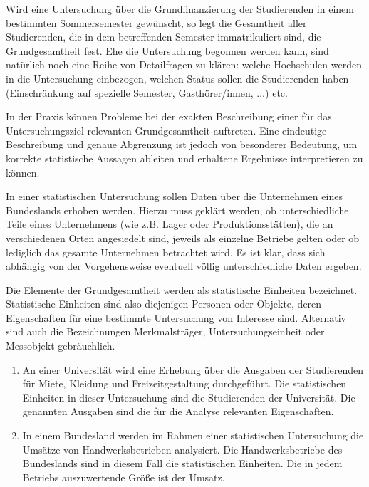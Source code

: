 \documentclass{lecture}
\begin{document}
    \begin{example}
        Wird eine Untersuchung über die Grundfinanzierung der Studierenden in einem bestimmten Sommersemester gewünscht, so legt die Gesamtheit aller Studierenden, die in dem betreffenden Semester immatrikuliert sind, die Grundgesamtheit fest.
        Ehe die Untersuchung begonnen werden kann, sind natürlich noch eine Reihe von Detailfragen zu klären:
        welche Hochschulen werden in die Untersuchung einbezogen, welchen Status sollen die Studierenden haben (Einschränkung auf spezielle Semester, Gasthörer/innen, \(\ldots\)) etc.
    \end{example}

    In der Praxis können Probleme bei der exakten Beschreibung einer für das Untersuchungsziel relevanten Grundgesamtheit auftreten.
    Eine eindeutige Beschreibung und genaue Abgrenzung ist jedoch von besonderer Bedeutung, um korrekte statistische Aussagen ableiten und erhaltene Ergebnisse interpretieren zu können.

    \begin{example}
        In einer statistischen Untersuchung sollen Daten über die Unternehmen eines Bundeslands erhoben werden.
        Hierzu muss geklärt werden, ob unterschiedliche Teile eines Unternehmens (wie z.B. Lager oder Produktionsstätten), die an verschiedenen Orten angesiedelt sind, jeweils als einzelne Betriebe gelten oder ob lediglich das gesamte Unternehmen betrachtet wird.
        Es ist klar, dass sich abhängig von der Vorgehensweise eventuell völlig unterschiedliche Daten ergeben.
    \end{example}

    Die Elemente der Grundgesamtheit werden als statistische Einheiten bezeichnet.
    Statistische Einheiten sind also diejenigen Personen oder Objekte, deren Eigenschaften für eine bestimmte Untersuchung von Interesse sind.
    Alternativ sind auch die Bezeichnungen Merkmalsträger, Untersuchungseinheit oder Messobjekt gebräuchlich.

    \begin{example}
        \begin{enumerate}
            \item An einer Universität wird eine Erhebung über die Ausgaben der Studierenden für Miete, Kleidung und Freizeitgestaltung durchgeführt.
            Die statistischen Einheiten in dieser Untersuchung sind die Studierenden der Universität.
            Die genannten Ausgaben sind die für die Analyse relevanten Eigenschaften.
            \item In einem Bundesland werden im Rahmen einer statistischen Untersuchung die Umsätze von Handwerksbetrieben analysiert.
            Die Handwerksbetriebe des Bundeslands sind in diesem Fall die statistischen Einheiten.
            Die in jedem Betriebs auszuwertende Größe ist der Umsatz.
        \end{enumerate}
    \end{example}
\end{document}

